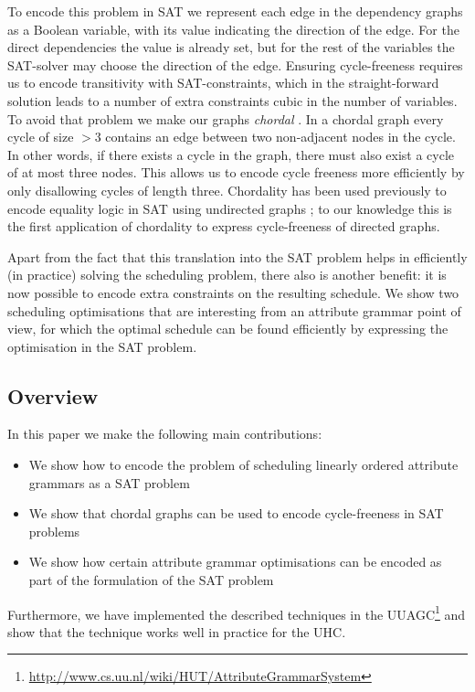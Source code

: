 \documentclass{llncs}
\begin{document}
To encode this problem in SAT we represent each edge in the dependency graphs as a Boolean variable, with its value indicating the direction of the edge. For the direct dependencies the value is already set, but for the rest of the variables the SAT-solver may choose the direction of the edge. Ensuring cycle-freeness requires us to encode transitivity with SAT-constraints, which in the straight-forward solution leads to a number of extra constraints cubic in the number of variables. To avoid that problem we make our graphs \emph{chordal} \cite{Dirac:1961}. In a chordal graph every cycle of size $> 3$ contains an edge between two non-adjacent nodes in the cycle. In other words, if there exists a cycle in the graph, there must also exist a cycle of at most three nodes. This allows us to encode cycle freeness more efficiently by only disallowing cycles of length three. Chordality has been used previously to encode equality logic in SAT using undirected graphs \cite{bryant-chordal}; to our knowledge this is the first application of chordality to express cycle-freeness of directed graphs.

Apart from the fact that this translation into the SAT problem helps in efficiently (in practice) solving the scheduling problem, there also is another benefit: it is now possible to encode extra constraints on the resulting schedule. We show two scheduling optimisations that are interesting from an attribute grammar point of view, for which the optimal schedule can be found efficiently by expressing the optimisation in the SAT problem.

\subsection{Overview}
In this paper we make the following main contributions:
\begin{itemize}
\item We show how to encode the problem of scheduling linearly ordered attribute grammars as a SAT problem
\item We show that chordal graphs can be used to encode cycle-freeness in SAT problems
\item We show how certain attribute grammar optimisations can be encoded as part of the formulation of the SAT problem
\end{itemize}
Furthermore, we have implemented the described techniques in the UUAGC\footnote{\url{http://www.cs.uu.nl/wiki/HUT/AttributeGrammarSystem}} \cite{combinator-languages} and show that the technique works well in practice for the UHC.
\end{document}
